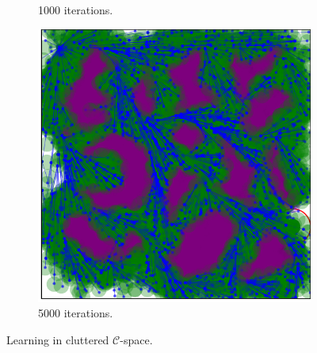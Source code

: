 \documentclass{ctuthesis}
\begin{document}
\begin{figure}[!ht]
\begin{subfigure}[b]{0.32\textwidth}
    \caption{1000 iterations.}
  \end{subfigure}  
  \begin{subfigure}[b]{0.32\textwidth}
    \includegraphics[width=\textwidth]{figChap5/Maze_clutter_RRTstarML_learning5000.pdf}  
    \caption{5000 iterations.}
  \end{subfigure}  
  \caption{Learning in cluttered $\mathcal{C}$-space.}
  \label{fig:learning_clutter}
\end{figure}
\clearpage
\end{document}
